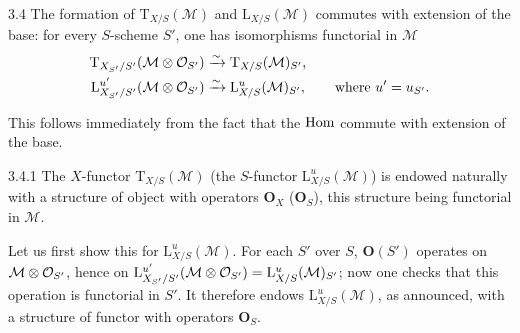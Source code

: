 \begin{proposition}{3.4}
\label{II.3.4}
The formation of \(\mathrm{T}_{X/S}(\mathcal{M})\) and
\(\mathrm{L}_{X/S}(\mathcal{M})\) commutes with extension of the base: for
every \(S\)-scheme \(S'\), one has isomorphisms functorial in \(\mathcal{M}\)
\begin{align*}
\mathrm{T}_{X_{S'}/S'}(\mathcal{M}\otimes\mathcal{O}_{S'})
  &\xrightarrow{\sim}\mathrm{T}_{X/S}(\mathcal{M})_{S'},\\
\mathrm{L}^{u'}_{X_{S'}/S'}(\mathcal{M}\otimes\mathcal{O}_{S'})
  &\xrightarrow{\sim}\mathrm{L}^{u}_{X/S}(\mathcal{M})_{S'},
  \qquad\text{where }u'=u_{S'}.
\end{align*}
\end{proposition}

This follows immediately from the fact that the \(\operatorname{Hom}\) commute with
extension of the base.

\begin{corollary}{3.4.1}
\label{II.3.4.1}
The \(X\)-functor \(\mathrm{T}_{X/S}(\mathcal{M})\) (\resp the \(S\)-functor
\(\mathrm{L}^{u}_{X/S}(\mathcal{M})\)) is endowed naturally with a structure of
object with operators \(\mathbf{O}_X\) (\resp \(\mathbf{O}_S\)), this
structure being functorial in \(\mathcal{M}\).
\end{corollary}

Let us first show this for \(\mathrm{L}^{u}_{X/S}(\mathcal{M})\). For each
\(S'\) over \(S\), \(\mathbf{O}(S')\) operates on
\(\mathcal{M}\otimes\mathcal{O}_{S'}\), hence on
\(\mathrm{L}^{u'}_{X_{S'}/S'}(\mathcal{M}\otimes\mathcal{O}_{S'})
=\mathrm{L}^{u}_{X/S}(\mathcal{M})_{S'}\); now one checks that this operation
is functorial in \(S'\). It therefore endows
\(\mathrm{L}^{u}_{X/S}(\mathcal{M})\), as announced, with a structure of
functor with operators \(\mathbf{O}_S\).

